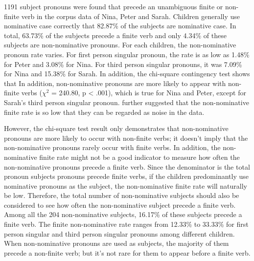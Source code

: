 1191 subject pronouns were found that precede an unambiguous finite or non-finite verb in the corpus data of Nina, Peter and Sarah. Children generally use nominative case correctly that 82.87\% of the subjects are nominative case. In total, 63.73\% of the subjects precede a finite verb and only 4.34\% of these subjects are non-nominative pronouns. For each children, the non-nominative pronoun rate varies. For first person singular pronoun, the rate is as low as 1.48\% for Peter and 3.08\% for Nina. For third person singular pronouns, it was 7.09\% for Nina and 15.38\% for Sarah. In addition, the chi-square contingency test shows that In addition, non-nominative pronouns are more likely to appear with non-finite verbs ($\chi^2$ = 240.80, p < .001), which is true for Nina and Peter, except for Sarah's third person singular pronoun. \cite{schutze2001} further suggested that the non-nominative finite rate is so low that they can be regarded as noise in the data.

However, the chi-square test result only demonstrates that non-nominative pronouns are more likely to occur with non-finite verbs; it doesn't imply that the non-nominative pronouns rarely occur with finite verbs. In addition, the non-nominative finite rate might not be a good indicator to measure how often the non-nominative pronouns precede a finite verb. Since the denominator is the total pronoun subjects pronouns precede finite verbs, if the children predominantly use nominative pronouns as the subject, the non-nominative finite rate will naturally be low. Therefore, the total number of non-nominative subjects should also be considered to see how often the non-nominative subject precede a finite verb. Among all the 204 non-nominative subjects, 16.17\% of these subjects precede a finite verb. The finite non-nominative rate ranges from 12.33\% to 33.33\% for first person singular and third person singular pronouns among different children. When non-nominative pronouns are used as subjects, the majority of them precede a non-finite verb; but it's not rare for them to appear before a finite verb. 

